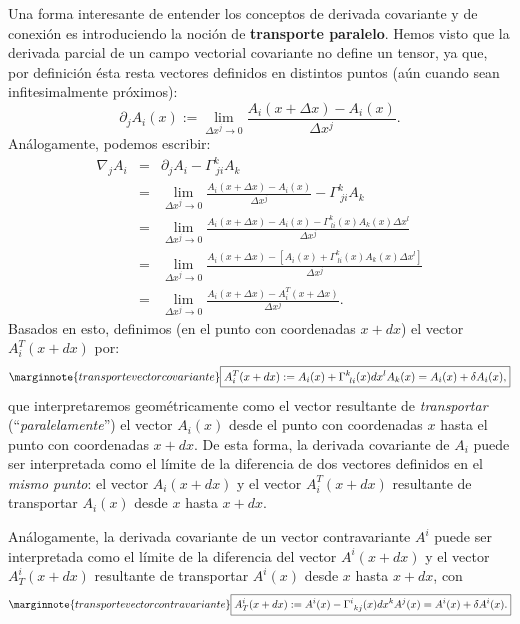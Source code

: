 Una forma interesante de entender los conceptos de derivada covariante y de
conexión es introduciendo la noción de \textbf{transporte paralelo}. Hemos visto que la derivada parcial de un campo vectorial covariante no define un tensor, ya que, por definición ésta resta vectores definidos en distintos puntos (aún cuando sean infitesimalmente próximos):
\begin{equation}
\partial_jA_i(x):=\lim_{\Delta x^j \rightarrow0}\frac{A_i(x +\Delta x)-A_i(x)}{\Delta x^j}. \label{tp1}
\end{equation}
Análogamente, podemos escribir:
\begin{eqnarray}
\nabla_jA_i&=&\partial_jA_i-\Gamma_{\ ji}^kA_k \\
&=& \lim_{\Delta x^j\rightarrow0}\frac{A_i(x+\Delta x)-A_i(x)}{\Delta x^j}-\Gamma_{\ ji}^kA_k \\
&=& \lim_{\Delta x^j\rightarrow0}\frac{A_i(x+\Delta x)-A_i(x)-\Gamma_{\
li}^k(x)A_k(x)\Delta x^l}{\Delta x^j}\\
&=& \lim_{\Delta x^j\rightarrow0}\frac{A_i(x+\Delta x)-\left[A_i(x)+\Gamma_{\
li}^k(x)A_k(x)\Delta x^l\right]}{\Delta x^j}\\
&=& \lim_{\Delta x^j\rightarrow0}\frac{A_i(x+\Delta x)-A^T_i(x+\Delta x)}{\Delta x^j}.
\end{eqnarray}
Basados en esto, definimos (en el punto con coordenadas $x+dx$) el vector $A^T_i(x+dx)$ por:
\begin{equation}\marginnote{transporte vector covariante}
 \boxed{A^T_i(x+dx):=A_i(x)+\Gamma_{\ li}^k(x)dx^lA_k(x)=A_i(x)+\delta A_i(x),} \label{tranAcov}
\end{equation}
que interpretaremos geométricamente como el vector resultante de \textit{transportar}
(``\textit{paralelamente}'') el vector $A_i(x)$ desde el punto con coordenadas $x$ hasta el punto con coordenadas $x+dx$. De esta forma, la derivada covariante de $A_i$ puede
ser interpretada como el límite de la diferencia de dos vectores definidos en el \textit{mismo punto}: el vector $A_i(x+dx)$ y el vector $A^T_i(x+dx)$ resultante de transportar $A_i(x)$ desde $x$ hasta $x+dx$.

Análogamente, la derivada covariante de un vector contravariante $A^i$ puede
ser interpretada como el límite de la diferencia del vector $A^i(x+dx)$ y el
vector $A_T^i(x+dx)$ resultante de transportar $A^i(x)$ desde $x$ hasta $x+dx$,
con
\begin{equation}\marginnote{transporte vector contravariante}
 \boxed{A_T^i(x+dx):=A^i(x)-\Gamma_{\ kj}^i(x)dx^kA^j(x)=A^i(x)+\delta
A^i(x).}\label{tranAcontr}
\end{equation}

